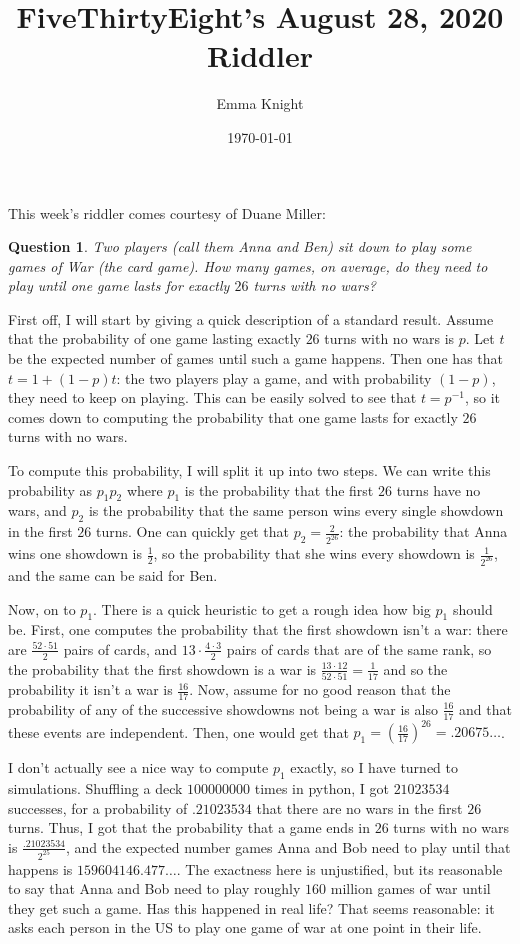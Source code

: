 \documentclass[11pt]{article}
\title{FiveThirtyEight's August 28, 2020 Riddler}
\author{Emma Knight}
\date{\today}
\newtheorem{question}[theorem]{Question}
\theoremstyle{definition}
\begin{document}
\maketitle
This week's riddler comes courtesy of Duane Miller:
\begin{question}
Two players (call them Anna and Ben) sit down to play some games of War (the card game).  How many games, on average, do they need to play until one game lasts for exactly $26$ turns with no wars?
\end{question}

First off, I will start by giving a quick description of a standard result.  Assume that the probability of one game lasting exactly $26$ turns with no wars is $p$.  Let $t$ be the expected number of games until such a game happens.  Then one has that $t = 1 + (1-p)t$: the two players play a game, and with probability $(1-p)$, they need to keep on playing.  This can be easily solved to see that $t = p^{-1}$, so it comes down to computing the probability that one game lasts for exactly $26$ turns with no wars.

To compute this probability, I will split it up into two steps.  We can write this probability as $p_1p_2$ where $p_1$ is the probability that the first $26$ turns have no wars, and $p_2$ is the probability that the same person wins every single showdown in the first $26$ turns.  One can quickly get that $p_2 = \frac{2}{2^{26}}$: the probability that Anna wins one showdown is $\frac{1}{2}$, so the probability that she wins every showdown is $\frac{1}{2^{26}}$, and the same can be said for Ben.

Now, on to $p_1$.  There is a quick heuristic to get a rough idea how big $p_1$ should be.  First, one computes the probability that the first showdown isn't a war: there are $\frac{52\cdot51}{2}$ pairs of cards, and $13\cdot\frac{4\cdot3}{2}$ pairs of cards that are of the same rank, so the probability that the first showdown is a war is $\frac{13\cdot12}{52\cdot51} = \frac{1}{17}$ and so the probability it isn't a war is $\frac{16}{17}$.  Now, assume for no good reason that the probability of any of the successive showdowns not being a war is also $\frac{16}{17}$ and that these events are independent.  Then, one would get that $p_1 = \left(\frac{16}{17}\right)^{26} = .20675 \ldots$.

I don't actually see a nice way to compute $p_1$ exactly, so I have turned to simulations.  Shuffling a deck $100000000$ times in python, I got $21023534$ successes, for a probability of $.21023534$ that there are no wars in the first $26$ turns.  Thus, I got that the probability that a game ends in $26$ turns with no wars is $\frac{.21023534}{2^25}$, and the expected number games Anna and Bob need to play until that happens is $159604146.477\ldots$.  The exactness here is unjustified, but its reasonable to say that Anna and Bob need to play roughly $160$ million games of war until they get such a game.  Has this happened in real life?  That seems reasonable: it asks each person in the US to play one game of war at one point in their life.
\end{document}
